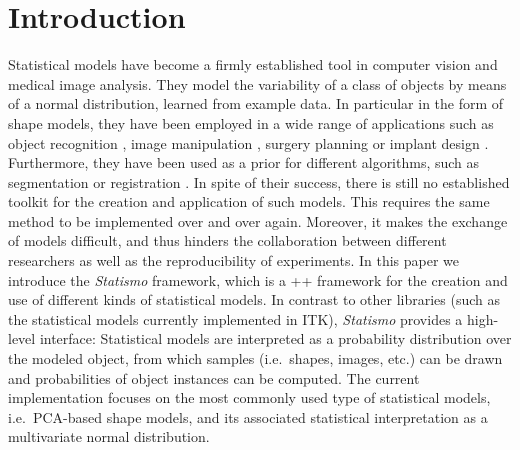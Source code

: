 \documentclass{InsightArticle}
\newcommand{\IJhandlerIDnumber}{1338}
\newcommand{\Statismo}{\emph{Statismo}\xspace}
\begin{document}
\IJhandlenote{\IJhandlerIDnumber}

\tableofcontents

\section{Introduction}

Statistical models have become a firmly established tool in computer
vision and medical image analysis.  They model the variability of a
class of objects by means of a normal distribution,
learned from example data.  In particular in the form of shape models,
they have been employed in a wide range of applications such as object
recognition \cite{cootes_use_1994, paysan_3d_2009}, image manipulation
\cite{blanz_morphable_1999}, surgery planning
\cite{zheng_statistical_2011,hawkes_tissue_2005} or implant design
\cite{bou-sleiman_minimization_2011,kozic_statistical_2009}.
Furthermore, they have been used as a prior for different algorithms,
such as segmentation \cite{heimann_statistical_2009} or registration
\cite{albrecht_statistical_2008}.  In spite of their success, there is
still no established toolkit for the creation and application of such
models. This requires the same method to be implemented over and over
again. Moreover, it makes the exchange of models difficult, and thus
hinders the collaboration between different researchers as well as the
reproducibility of experiments.  In this paper we introduce the
\Statismo framework, which is a \C++ framework for the creation and
use of different kinds of statistical models.  In contrast to other
libraries (such as the statistical models currently implemented in
ITK), \Statismo provides a high-level interface: Statistical models
are interpreted as a probability distribution over the modeled object,
from which samples (i.e.\ shapes, images, etc.)  can be drawn and
probabilities of object instances can be computed.  The current
implementation focuses on the most commonly used type of statistical
models, i.e.\ PCA-based shape models, and its associated statistical
interpretation as a multivariate normal distribution.
\end{document}
